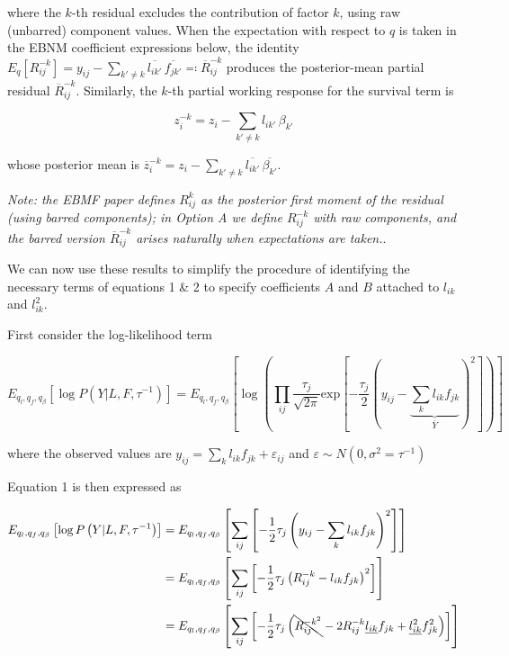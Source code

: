 \documentclass{article}[12pt]
\begin{document}
where the $k$-th residual excludes the contribution of factor $k$, using raw (unbarred) component values. When the expectation with respect to $q$ is taken in the EBNM coefficient expressions below, the identity
$E_q\!\left[R^{-k}_{ij}\right] = y_{ij} - \sum_{k'\neq k}\overline{l_{ik'}}\,\overline{f_{jk'}} \eqqcolon \overline{R}^{-k}_{ij}$
produces the posterior-mean partial residual $\overline{R}^{-k}_{ij}$. Similarly, the $k$-th partial working response for the survival term is

\begin{equation}\label{eq:zk}
    z_{i}^{-k} = z_i - \sum_{k'\neq k} l_{ik'}\, \beta_{k'}
\end{equation}

whose posterior mean is $\overline{z}^{-k}_{i} = z_i - \sum_{k'\neq k}\overline{l_{ik'}}\,\overline{\beta_{k'}}$.

\textit{Note: the EBMF paper defines $R_{ij}^{k}$ as the posterior first moment of the residual (using barred components); in Option A we define $R_{ij}^{-k}$ with raw components, and the barred version $\overline{R}^{-k}_{ij}$ arises naturally when expectations are taken.}.

\medskip
We can now use these results to simplify the procedure of identifying the necessary terms of equations 1 \& 2 to specify coefficients $A$ and $B$ attached to $l_{ik}$ and $l_{ik}^{2}$.

First consider the log-likelihood term

\begin{equation}
    E_{q_l, q_f, q_{\beta}}\left[\log P\left(Y \vert L, F, \tau^{-1}\right)\right] = E_{q_l, q_f, q_{\beta}}\left[\log \left(\prod_{ij} \frac{\tau_{j}}{\sqrt{2\pi}}\text{exp}\left[-\frac{\tau_{j}}{2}\left(y_{ij}-\underbrace{\sum_{k}l_{ik}f_{jk}}_{\bar{Y}}\right)^2\right]\right)\right]
\end{equation}

where the observed values are $y_{ij} = \sum_{k}l_{ik}f_{jk} + \varepsilon_{ij}$ and $\varepsilon \sim N\left(0, \sigma^2 = \tau^{-1}\right)$

Equation 1 is then expressed as

\begin{align}
    E_{q_l, q_f, q_{\beta}}\left[\log P\left(Y \vert L, F, \tau^{-1}\right)\right] &= E_{q_l, q_f, q_{\beta}}\left[\sum_{ij}\left[-\frac{1}{2}\tau_{j}\left(y_{ij}-\sum_{k}l_{ik}f_{jk}\right)^2\right]\right]\\
    &= E_{q_l, q_f, q_{\beta}}\left[\sum_{ij}\left[-\frac{1}{2}\tau_{j}\left(R_{ij}^{-k} - l_{ik}f_{jk}\right)^2\right]\right]\\
    &= E_{q_l, q_f, q_{\beta}}\left[\sum_{ij}\left[-\frac{1}{2}\tau_{j}\left(\bcancel{R_{ij}^{-k^2}} - 2R_{ij}^{-k}
    \underline{l_{ik}}f_{jk}+\underline{l_{ik}^{2}}f_{jk}^{2}\right)\right]\right]
\end{align}
\end{document}
